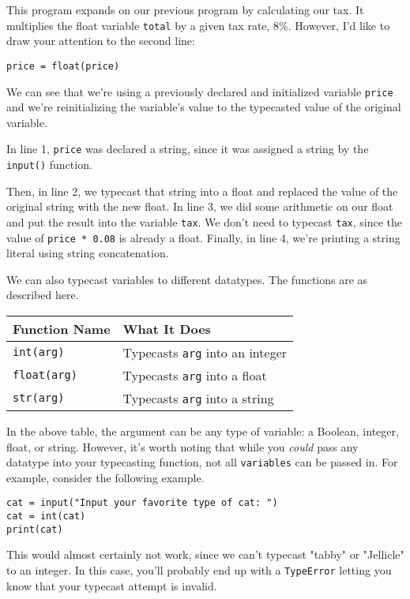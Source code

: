 This program expands on our previous program by calculating our tax. It multiplies the float variable \verb|total| by a given tax rate, 8\%. However, I'd like to draw your attention to the second line:\par
\begin{lstlisting}[style=pippython]
price = float(price)
\end{lstlisting}
We can see that we're using a previously declared and initialized variable \verb|price| and we're reinitializing the variable's value to the typecasted value of the original variable.\par
In line 1, \verb|price| was declared a string, since it was assigned a string by the \verb|input()| function.\par Then, in line 2, we typecast that string into a float and replaced the value of the original string with the new float. In line 3, we did some arithmetic on our float and put the result into the variable \verb|tax|. We don't need to typecast \verb|tax|, since the value of \verb|price * 0.08| is already a float. Finally, in line 4, we're printing a string literal using string concatenation.\par
We can also typecast variables to different datatypes. The functions are as described here.\par
\vspace{5mm}
\begin{tabular}{|l|l|}
\hline
Function Name     & What It Does                         \\
\hline
\verb|int(arg)|   & Typecasts \verb|arg| into an integer \\
\hline
\verb|float(arg)| & Typecasts \verb|arg| into a float    \\
\hline
\verb|str(arg)|   & Typecasts \verb|arg| into a string   \\
\hline
\end{tabular}
\vspace{5mm}\par
In the above table, the argument can be any type of variable: a Boolean, integer, float, or string. However, it's worth noting that while you \textit{could} pass any datatype into your typecasting function, not all \verb|variables| can be passed in. For example, consider the following example.
\begin{lstlisting}[style=pippython]
cat = input("Input your favorite type of cat: ")
cat = int(cat)
print(cat)
\end{lstlisting}
This would almost certainly not work, since we can't typecast "tabby" or "Jellicle" to an integer. In this case, you'll probably end up with a \verb|TypeError| letting you know that your typecast attempt is invalid.\par

